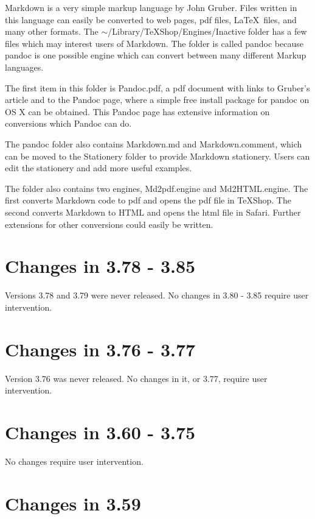 \documentclass[11pt, oneside]{amsart}
\begin{document}
Markdown is a very simple markup language by John Gruber. Files written in this language can easily be converted to web pages, pdf files, \LaTeX\ files, and many other formats. The $\sim$/Library/TeXShop/Engines/Inactive folder has a few files which may interest users of Markdown. The folder is called pandoc because pandoc is one possible engine which can convert between many different Markup languages. 

The first item in this folder is Pandoc.pdf, a pdf document with links to Gruber's article and to the Pandoc page, where a simple free install package for pandoc on OS X can be obtained. This Pandoc page has extensive information on conversions which Pandoc can do.

The pandoc folder also contains Markdown.md and Markdown.comment, which can be moved to the Stationery folder to provide Markdown stationery. Users can edit the stationery and add more useful examples.

The folder also contains two engines, Md2pdf.engine and Md2HTML.engine. The first converts Markdown code to pdf and opens the pdf file in TeXShop. The second converts Markdown to HTML and opens the html file in Safari.
Further extensions for other conversions could easily be written.

\section{Changes in 3.78 - 3.85}

Versions 3.78 and 3.79 were never released. No changes in 3.80 - 3.85 require user intervention.



\section{Changes in 3.76 - 3.77}

Version 3.76 was never released. No changes in it, or 3.77, require user intervention.


\section{Changes in 3.60 - 3.75}

No changes require user intervention.

\section{Changes in 3.59}
\end{document}
